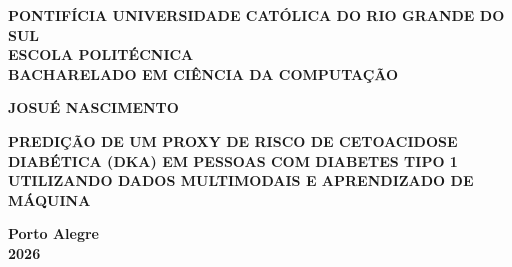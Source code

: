\documentclass[12pt,a4paper]{article}
\begin{document}
\begin{titlepage}
    \begin{center}
        \singlespacing
        \textbf{PONTIFÍCIA UNIVERSIDADE CATÓLICA DO RIO GRANDE DO SUL}\\
        \textbf{ESCOLA POLITÉCNICA}\\
        \textbf{BACHARELADO EM CIÊNCIA DA COMPUTAÇÃO}

        \vspace{4cm}

        \textbf{JOSUÉ NASCIMENTO}

        \vfill

        \textbf{PREDIÇÃO DE UM PROXY DE RISCO DE CETOACIDOSE DIABÉTICA (DKA) EM PESSOAS COM DIABETES TIPO 1 UTILIZANDO DADOS MULTIMODAIS E APRENDIZADO DE MÁQUINA}

        \vfill

        \textbf{Porto Alegre}\\
        \textbf{2026}
    \end{center}
\end{titlepage}

\newpage
\end{document}

